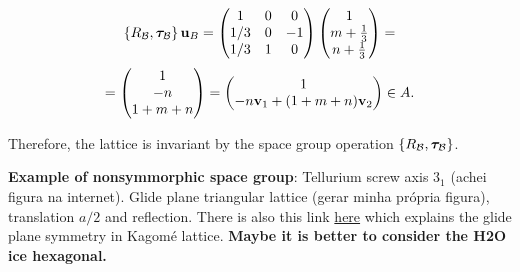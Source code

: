 $$
\{R_{\mathcal{B}}, {\bm{\tau}}_{\mathcal{B}}\} \, {\vb{u}}_B =
\begin{pmatrix}
1 & 0 & 0 \\
1/3 & 0 & -1 \\
1/3 & 1 & 0 \\
\end{pmatrix}
\begin{pmatrix}
1 \\ m + \frac{1}{3} \\ n + \frac{1}{3}
\end{pmatrix}
=
$$
$$
=
\begin{pmatrix}
1 \\ -n \\ 1+m+n
\end{pmatrix}
=
\begin{pmatrix}
1 \\ -n {\vb{v}}_1 + (1+m+n) {\vb{v}}_2
\end{pmatrix}
\in A.
$$

Therefore, the lattice is invariant by the space group operation $\{R_{\mathcal{B}}, {\bm{\tau}}_{\mathcal{B}}\}$.

\n

\textbf{Example of nonsymmorphic space group}: Tellurium screw axis $3_1$ (achei figura na internet). Glide plane triangular lattice (gerar minha própria figura), translation $a/2$ and reflection. There is also this link \href{https://physics.stackexchange.com/questions/568476/example-of-a-space-group-which-does-not-contain-the-point-group-as-a-subgroup}{here} which explains the glide plane symmetry in Kagomé lattice. \textbf{Maybe it is better to consider the H2O ice hexagonal.}

%
%
%

